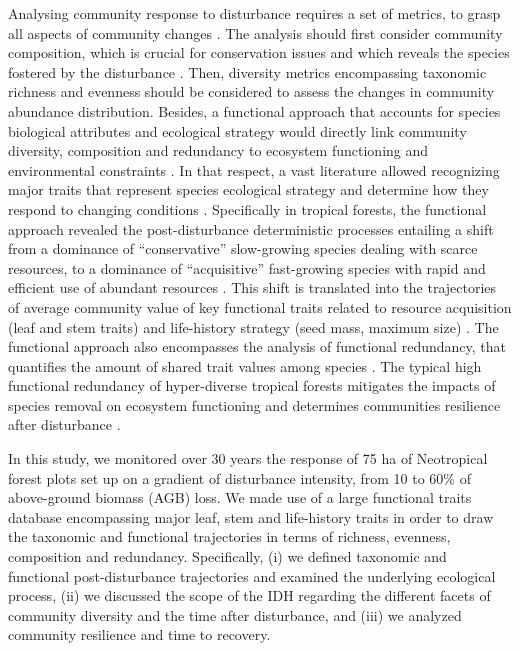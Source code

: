 \documentclass[fleqn,10pt]{ArtEcoFoG} %
\begin{document}
Analysing community response to disturbance requires a set of metrics,
to grasp all aspects of community changes
\citep{Sheil2003, Shea2004, Mayfield2010}. The analysis should first
consider community composition, which is crucial for conservation issues
and which reveals the species fostered by the disturbance
\citep{Lavorel2002, Bellwood2006}. Then, diversity metrics encompassing
taxonomic richness and evenness should be considered to assess the
changes in community abundance distribution. Besides, a functional
approach that accounts for species biological attributes and ecological
strategy would directly link community diversity, composition and
redundancy to ecosystem functioning and environmental constraints
\citep{Violle2007b, Baraloto2012a}. In that respect, a vast literature
allowed recognizing major traits that represent species ecological
strategy and determine how they respond to changing conditions
\citep{Diaz2005}. Specifically in tropical forests, the functional
approach revealed the post-disturbance deterministic processes entailing
a shift from a dominance of ``conservative'' slow-growing species
dealing with scarce resources, to a dominance of ``acquisitive''
fast-growing species with rapid and efficient use of abundant resources
\citep{Rees2001, Reich2014, Herault2011}. This shift is translated into
the trajectories of average community value of key functional traits
related to resource acquisition (leaf and stem traits) and life-history
strategy (seed mass, maximum size)
\citep{Wright2004, TerSteege2006, Westoby2006a, Chave2009b}. The
functional approach also encompasses the analysis of functional
redundancy, that quantifies the amount of shared trait values among
species \citep{Carmona2016}. The typical high functional redundancy of
hyper-diverse tropical forests \citep{Bellwood2006} mitigates the
impacts of species removal on ecosystem functioning and determines
communities resilience after disturbance \citep{Elmqvist2003, Diaz2005}.

In this study, we monitored over 30 years the response of 75 ha of
Neotropical forest plots set up on a gradient of disturbance intensity,
from 10 to 60\% of above-ground biomass (AGB) loss. We made use of a
large functional traits database encompassing major leaf, stem and
life-history traits in order to draw the taxonomic and functional
trajectories in terms of richness, evenness, composition and redundancy.
Specifically, (i) we defined taxonomic and functional post-disturbance
trajectories and examined the underlying ecological process, (ii) we
discussed the scope of the IDH regarding the different facets of
community diversity and the time after disturbance, and (iii) we
analyzed community resilience and time to recovery.
\end{document}

